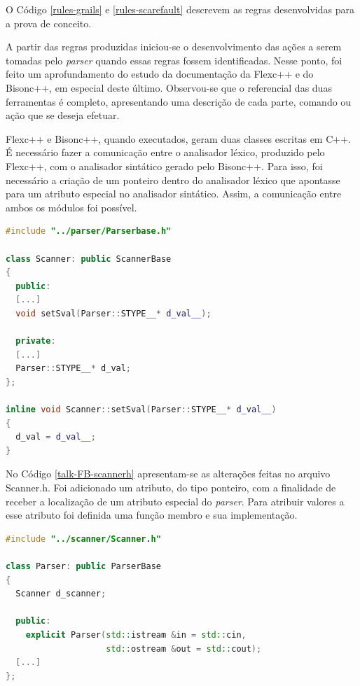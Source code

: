 \par
\indent O Código \ref{rules-grails} e \ref{rules-scarefault} descrevem as regras desenvolvidas para a prova de conceito.
\par
\indent A partir das regras produzidas iniciou-se o desenvolvimento das ações a serem tomadas pelo \textit{parser} quando essas regras fossem identificadas. Nesse ponto, foi feito um aprofundamento do estudo da documentação da Flexc++ e do Bisonc++, em especial deste último. Observou-se que o referencial das duas ferramentas é completo, apresentando uma descrição de cada parte, comando ou ação que se deseja efetuar.
\par
\indent Flexc++ e Bisonc++, quando executados, geram duas classes escritas em C++. É necessário fazer a comunicação entre o analisador léxico, produzido pelo Flexc++, com o analisador sintático gerado pelo Bisonc++. Para isso, foi necessário a criação de um ponteiro dentro do analisador léxico que apontasse para um atributo especial no analisador sintático. Assim, a comunicação entre ambos os módulos foi possível.
\begin{lstlisting}[language=C++, label=talk-FB-scannerh, caption=Alterações no Scanner.h para comunicação entre Analisador Léxico e Sintático]
#include "../parser/Parserbase.h"

class Scanner: public ScannerBase
{
  public:
  [...]
  void setSval(Parser::STYPE__* d_val__);
  
  private:
  [...]
  Parser::STYPE__* d_val;
};

inline void Scanner::setSval(Parser::STYPE__* d_val__)
{
  d_val = d_val__;
}
\end{lstlisting}
\par
\indent No Código \ref{talk-FB-scannerh} apresentam-se as alterações feitas no arquivo Scanner.h. Foi adicionado um atributo, do tipo ponteiro, com a finalidade de receber a localização de um atributo especial do \textit{parser}. Para atribuir valores a esse atributo foi definida uma função membro e sua implementação.
\par
\begin{lstlisting}[language=C++, label=talk-FB-parserh, caption=Alterações no Parser.h para comunicação entre Analisador Léxico e Sintático]
#include "../scanner/Scanner.h"

class Parser: public ParserBase
{
  Scanner d_scanner;
  
  public:
    explicit Parser(std::istream &in = std::cin,
                    std::ostream &out = std::cout);
  [...]
};

\end{lstlisting}

